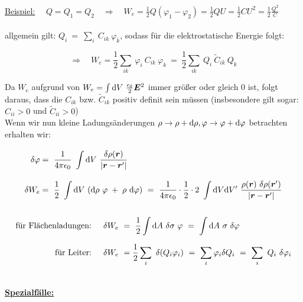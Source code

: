 \underline{Beispiel:} $\quad Q=Q_1=Q_2 \quad\Rightarrow\quad  W_e =\frac{1}{2}Q(\varphi_1-\varphi_2 ) = \frac{1}{2}QU = \frac{1}{2}CU^2 = \frac{1}{2}\frac{Q^2}{C}$\\
\ \\
allgemein gilt: $Q_i \ = \ \sum_i \ C_{ik} \ \varphi_k$, sodass für die elektrostatische Energie folgt:

\begin{equation*}
\Rightarrow \quad W_e = \frac{1}{2} \sum_{ik} \ \varphi_i \ C_{ik} \ \varphi_k \ = 
\ \frac{1}{2} \sum_{ik} \ Q_i \ \tilde{C}_{ik} \ Q_k
\end{equation*}

\newpage
Da $W_e$ aufgrund von $W_e = \int\d V \ \frac{\epsilon_0}{2} \vec{E}^2$ immer größer oder gleich 0 ist, folgt daraus, dass die $C_{ik}$ bzw. $\tilde{C}_{ik}$ positiv definit sein müssen (insbesondere gilt sogar: $C_{ii} > 0$ und $\tilde{C}_{ii} > 0$)\\
Wenn wir nun kleine Ladungsänderungen $\rho \rightarrow \rho +\mathrm{d} \rho, \varphi \rightarrow\varphi + \mathrm{d}\varphi$ betrachten erhalten wir:

\begin{align*}
\delta\varphi &= \ \frac{1}{4\pi\epsilon_0} \ \Int{}{}{V} \frac{\delta\rho(\vec{r})}{|\vec{r}-\vec{r}'|}\\
\delta W_e &= \ \frac{1}{2} \ \Int{}{}{V} (\d\rho \ \varphi \; + \; \rho \ \d\varphi) \ = \ \frac{1}{4\pi\epsilon_0} \cdot\frac{1}{2}\cdot 2 \ \int\d V \d V' \ \frac{\rho(\vec{r}) \ \delta\rho(\vec{r}')}{|\vec{r}-\vec{r}'|}
\end{align*}

\begin{align*}
\text{für Flächenladungen: } & \quad\delta W_e \ = \ \frac{1}{2}\Int{}{}{A}  \delta\sigma \ \varphi \ = \ \Int{}{}{A}  \sigma \ \delta\varphi\\
\text{für Leiter: } & \quad\delta W_e \ = \frac{1}{2}\sum_i \ \delta(Q_i\varphi_i) \ = \ \sum_i \varphi_i \delta Q_i \ = \ \sum_i \ Q_i \ \delta\varphi_i
\end{align*}

\ \\
\underline{\textbf{Spezialfälle:}}\\

